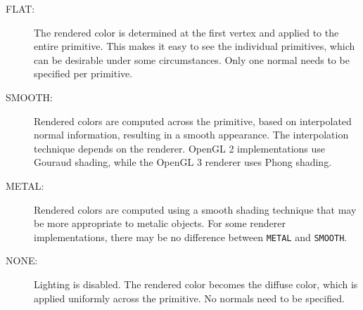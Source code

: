 %
\begin{description}

\item[FLAT:]\mbox{}

The rendered color is determined at the first vertex and applied to the
entire primitive. This makes it easy to see the individual primitives,
which can be desirable under some circumstances. Only one normal needs
to be specified per primitive.

\item[SMOOTH:]\mbox{}

Rendered colors are computed across the primitive, based on
interpolated normal information, resulting in a smooth appearance. The
interpolation technique depends on the renderer.  OpenGL 2
implementations use Gouraud shading, while the OpenGL 3 renderer uses
Phong shading.

\item[METAL:]\mbox{}

Rendered colors are computed using a smooth shading technique that may
be more appropriate to metalic objects. For some renderer
implementations, there may be no difference between {\tt METAL} and
{\tt SMOOTH}.

\item[NONE:]\mbox{}

Lighting is disabled. The rendered color becomes the diffuse color,
which is applied uniformly across the primitive. No normals need to be
specified.

\end{description}
%

